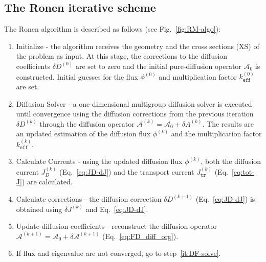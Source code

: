 %
\subsection{The Ronen iterative scheme}
\label{sec:RM-scheme}

The Ronen algorithm is described as follows (see Fig.~\ref{fig:RM-algo}):
\begin{enumerate}
	\item\label{it:init} Initialize - the algorithm receives the geometry and the cross sections (XS) of the problem as input. At this stage, the corrections to the diffusion coefficients $\delta D^{(0)}$ are set to zero and the initial pure-diffusion operator $\mathcal{A}_0$ is constructed. Initial guesses for the flux $\phi^{(0)}$ and multiplication factor $k^{(0)}_\texttt{eff}$ are set.
	\item\label{it:DF-solve} Diffusion Solver - a one-dimensional multigroup diffusion solver is executed until convergence using the diffusion corrections from the previous iteration $\delta D^{(k)}$ through the diffusion operator $\mathcal{A}^{(k)}=\mathcal{A}_0+\delta A^{(k)}$. The results are an updated estimation of the diffusion flux $\phi^{(k)}$ and the multiplication factor $k^{(k)}_\texttt{eff}$.
	\item\label{it:Js} Calculate Currents - using the updated diffusion flux $\phi^{(k)}$, both the diffusion current $J^{(k)}_D$ (Eq.~\ref{eq:JD-dJ}) and the transport current $J^{(k)}_\texttt{tr}$ (Eq.~\ref{eq:tot-J}) are calculated.
	\item\label{it:dD} Calculate corrections - the diffusion correction $\delta D^{(k+1)}$ (Eq.~\ref{eq:JD-dJ}) is obtained using $\delta J^{(k)}$ and Eq.~\eqref{eq:JD-dJ}.
	\item\label{it:dA} Update diffusion coefficients - reconstruct the diffusion operator $\mathcal{A}^{(k+1)} = \mathcal{A}_0+\delta \mathcal{A}^{(k+1)}$ (Eq.~\ref{eq:FD_diff_org}).
	\item\label{it:conv} If flux and eigenvalue are not converged, go to step~\ref{it:DF-solve}.
\end{enumerate}

